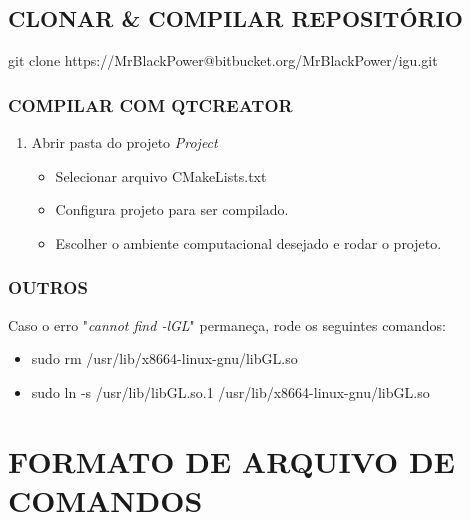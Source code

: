 \begin{appendices}
	\section{CLONAR \& COMPILAR REPOSITÓRIO}\label{compile}
	
	git clone https://MrBlackPower@bitbucket.org/MrBlackPower/igu.git
	
	
	
	\subsection{COMPILAR COM QTCREATOR}\label{qtcreator}
	
	\begin{enumerate}
		\item Abrir pasta do projeto \textit{Project}
		\begin{itemize}
			\item Selecionar arquivo CMakeLists.txt
			\item Configura projeto para ser compilado.
			\item Escolher o ambiente computacional desejado e rodar o projeto.
		\end{itemize}
	\end{enumerate}
	
	\subsection{OUTROS}\label{cmake}
	
	Caso o erro "\textit{cannot find -lGL}" permaneça, rode os seguintes comandos:
	
	\begin{itemize}
		\item sudo rm /usr/lib/x86\underline{\space\space}64-linux-gnu/libGL.so
		\item sudo ln -s /usr/lib/libGL.so.1 /usr/lib/x86\underline{\space\space}64-linux-gnu/libGL.so
	\end{itemize}
	
	
	
	\chapter{FORMATO DE ARQUIVO DE COMANDOS}\label{annex2}
	

\end{appendices}

